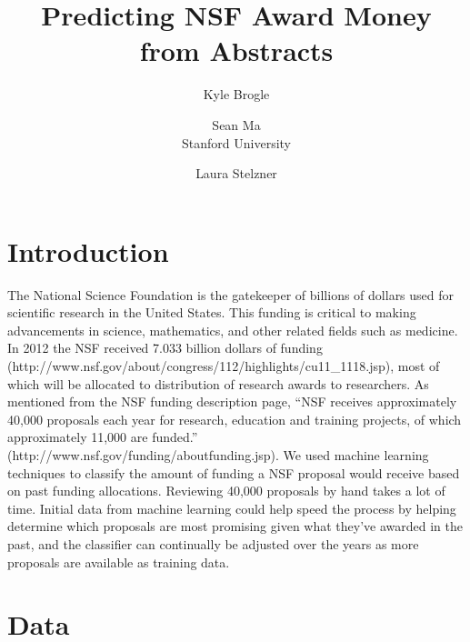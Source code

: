 \documentclass{sig-alternate}
\title{Predicting NSF Award Money from Abstracts}
\author{Kyle Brogle \and Sean Ma  \\ Stanford University \and Laura Stelzner}
\begin{document}
\ifnum{}
\ifnum{}
\begin{titlepage}
\else
{}
\fi
\else
{}
\fi

\maketitle


\ifnum{}
\ifnum{}
\end{titlepage}
\tableofcontents
\newpage
\fi
\fi

\section{Introduction}

The National Science Foundation is the gatekeeper of  billions of dollars used for scientific research in the United States.  This funding is critical to making advancements in science, mathematics, and other related fields such as medicine.  In 2012 the NSF received 7.033 billion dollars of funding (http://www.nsf.gov/about/congress/112/highlights/cu11\_1118.jsp), most of which will be allocated to distribution of research awards to researchers.   As mentioned from the NSF funding description page, “NSF receives approximately 40,000 proposals each year for research, education and training projects, of which approximately 11,000 are funded.” (http://www.nsf.gov/funding/aboutfunding.jsp).   We used machine learning techniques to classify the amount of funding a NSF proposal would receive based on past funding allocations.  Reviewing 40,000 proposals by hand takes a lot of time.  Initial data from machine learning could help speed the process by helping determine which proposals are most promising given what they’ve awarded in the past, and the classifier can continually be adjusted over the years as more proposals are available as training data.

\section{Data}
\end{document}
